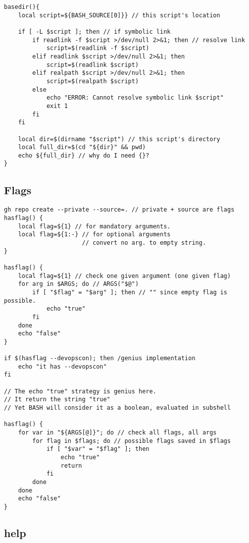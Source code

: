 \begin{verbatim}
basedir(){
    local script=${BASH_SOURCE[0]}} // this script's location

    if [ -L $script ]; then // if symbolic link
        if readlink -f $script >/dev/null 2>&1; then // resolve link
            script=$(readlink -f $script)
        elif readlink $script >/dev/null 2>&1; then
            script=$(readlink $script)
        elif realpath $script >/dev/null 2>&1; then
            script=$(realpath $script)
        else
            echo "ERROR: Cannot resolve symbolic link $script"
            exit 1 
        fi
    fi

    local dir=$(dirname "$script") // this script's directory
    local full_dir=$(cd "${dir}" && pwd)
    echo ${full_dir} // why do I need {}?
}
\end{verbatim}

\subsection{Flags}

\begin{verbatim}
gh repo create --private --source=. // private + source are flags
hasflag() {
    local flag=${1} // for mandatory arguments. 
    local flag=${1:-} // for optional arguments
                      // convert no arg. to empty string. 
}

hasflag() {
    local flag=${1} // check one given argument (one given flag)
    for arg in $ARGS; do // ARGS("$@")
        if [ "$flag" = "$arg" ]; then // "" since empty flag is possible.
            echo "true"
        fi
    done
    echo "false"
}

if $(hasflag --devopscon); then /genius implementation
    echo "it has --devopscon"
fi

// The echo "true" strategy is genius here. 
// It return the string "true"
// Yet BASH will consider it as a boolean, evaluated in subshell

hasflag() {
    for var in "${ARGS[@]}"; do // check all flags, all args
        for flag in $flags; do // possible flags saved in $flags
            if [ "$var" = "$flag" ]; then
                echo "true"
                return
            fi
        done
    done
    echo "false"
}
\end{verbatim}

\subsection{help}


